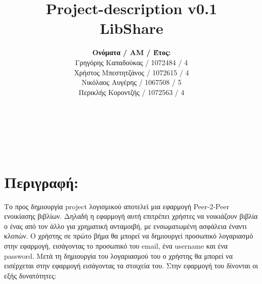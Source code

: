 \documentclass[12pt,a4paper]{article}
\title{Project-description v0.1 \\ LibShare}
\author{\textbf{Ονόματα / ΑΜ / Έτος:} \\ Γρηγόρης Καπαδούκας / 1072484 / 4\textdegree \\ Χρήστος Μπεστητζάνος / 1072615 / 4\textdegree \\ Νικόλαος Αυγέρης / 1067508 / 5\textdegree \\ Περικλής Κοροντζής / 1072563 / 4\textdegree}
\begin{document}
\makeatletter
\begin{center}
	\LARGE{\@title} \\
	\pagebreak
	\begin{LARGE}\@author\end{LARGE} \\
\end{center}
\pagebreak

\section{Περιγραφή:}
Το προς δημιουργία project λογισμικού αποτελεί μια εφαρμογή Peer-2-Peer ενοικίασης βιβλίων. Δηλαδή η εφαρμογή αυτή επιτρέπει χρήστες να νοικιάζουν βιβλία ο ένας από τον άλλο για χρηματική ανταμοιβή, με ενσωματωμένη ασφάλεια έναντι κλοπών. Ο χρήστης σε πρώτο βήμα θα μπορεί να δημιουργεί προσωπικό λογαριασμό στην εφαρμογή, εισάγοντας το προσωπικό του email, ένα username και ένα password. Μετά τη δημιουργία του λογαριασμού του ο χρήστης θα μπορεί να εισέρχεται στην εφαρμογή εισάγοντας τα στοιχεία του. Στην εφαρμογή του δίνονται οι εξής δυνατότητες:
\end{document}
